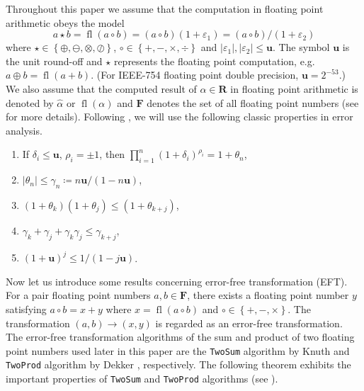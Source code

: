 \documentclass[letterpaper,10pt]{article}
\theoremstyle{definition}
\newcommand{\fl}[1]{\operatorname{fl}\left(#1\right)}
\newcommand{\eps}{\varepsilon}
\newcommand{\mach}{\mathbf{u}}
\begin{document}
Throughout this paper we assume that the computation in floating point
arithmetic obeys the model
\begin{equation}
  a \star b = \fl{a \circ b} = (a \circ b)(1 + \eps_1) =
  (a \circ b) / (1 + \eps_2)
\end{equation}
where \(\star \in \left\{\oplus, \ominus, \otimes, \oslash\right\}\), \(\circ
\in \left\{+, -, \times, \div\right\}\) and \(\left|\eps_1\right|,
\left|\eps_2\right| \leq \mach\). The symbol \(\mach\) is the unit round-off
and \(\star\) represents the floating point computation, e.g.
\(a \oplus b = \fl{a + b}\). (For IEEE-754 floating point double precision,
\(\mach = 2^{-53}\).) We also assume that the computed result of
\(\alpha \in \mathbf{R}\) in floating point arithmetic is denoted by
\(\widehat{\alpha}\) or \(\fl{\alpha}\) and \(\mathbf{F}\) denotes the set of
all floating point numbers (see \cite{Higham2002} for more details).
Following \cite{Higham2002}, we will use the following classic properties in
error analysis.

\begin{enumerate}
  \item If \(\delta_i \leq \mach\), \(\rho_i = \pm 1\), then
      \(\prod_{i = 1}^n (1 + \delta_i)^{\rho_i} = 1 + \theta_n\),
  \item \(\left|\theta_n\right| \leq \gamma_n \coloneqq
      n \mach / (1 - n \mach)\),
  \item \((1 + \theta_k)(1 + \theta_j) \leq (1 + \theta_{k + j})\),
  \item \(\gamma_k + \gamma_j + \gamma_k \gamma_j \leq \gamma_{k + j}\),
  \item \((1 + \mach)^j \leq 1 / (1 - j \mach)\).
\end{enumerate}

Now let us introduce some results concerning error-free transformation (EFT).
For a pair floating point numbers \(a, b \in \mathbf{F}\), there exists
a floating point number \(y\) satisfying \(a \circ b = x + y\) where
\(x = \fl{a \circ b}\) and \(\circ \in \left\{+, -, \times\right\}\).
The transformation \((a, b) \longrightarrow (x, y)\) is regarded as an
error-free transformation. The error-free transformation algorithms of the
sum and product of two floating point numbers used later in this paper are
the \texttt{TwoSum} algorithm by Knuth \cite{Knuth1997} and \texttt{TwoProd}
algorithm by Dekker \cite{Dekker1971}, respectively. The following theorem
exhibits the important properties of \texttt{TwoSum} and \texttt{TwoProd}
algorithms (see \cite{Ogita2005}).
\end{document}
